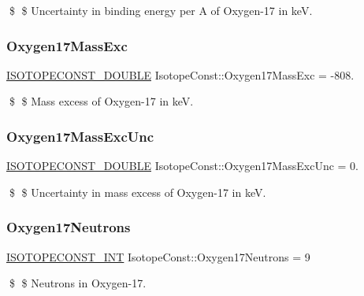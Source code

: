 \$ \$ Uncertainty in binding energy per A of Oxygen-\/17 in keV. \mbox{\label{group___isotope_const-_oxygen-_o17_gaef457572328acbb28c7a95d0b29884c8}} 
\subsubsection{\texorpdfstring{Oxygen17\+Mass\+Exc}{Oxygen17MassExc}}
{\footnotesize\ttfamily \mbox{\hyperlink{group___isotope_const-_macros_ga8f45a7272ce02c0b4c65c44636ed719a}{I\+S\+O\+T\+O\+P\+E\+C\+O\+N\+S\+T\+\_\+\+D\+O\+U\+B\+LE}} Isotope\+Const\+::\+Oxygen17\+Mass\+Exc = -\/808.}

\$ \$ Mass excess of Oxygen-\/17 in keV. \mbox{\label{group___isotope_const-_oxygen-_o17_ga554d74ffef7744a44732e081c18eb971}} 
\subsubsection{\texorpdfstring{Oxygen17\+Mass\+Exc\+Unc}{Oxygen17MassExcUnc}}
{\footnotesize\ttfamily \mbox{\hyperlink{group___isotope_const-_macros_ga8f45a7272ce02c0b4c65c44636ed719a}{I\+S\+O\+T\+O\+P\+E\+C\+O\+N\+S\+T\+\_\+\+D\+O\+U\+B\+LE}} Isotope\+Const\+::\+Oxygen17\+Mass\+Exc\+Unc = 0.}

\$ \$ Uncertainty in mass excess of Oxygen-\/17 in keV. \mbox{\label{group___isotope_const-_oxygen-_o17_gacf9545a3985f2e6918208695a3dd2e6d}} 
\subsubsection{\texorpdfstring{Oxygen17\+Neutrons}{Oxygen17Neutrons}}
{\footnotesize\ttfamily \mbox{\hyperlink{group___isotope_const-_macros_ga5f18360b3e99483a35c32d789e62621c}{I\+S\+O\+T\+O\+P\+E\+C\+O\+N\+S\+T\+\_\+\+I\+NT}} Isotope\+Const\+::\+Oxygen17\+Neutrons = 9}

\$ \$ Neutrons in Oxygen-\/17. \mbox{\label{group___isotope_const-_oxygen-_o17_ga802e4870963b001191df1df92fdbfe28}} 
